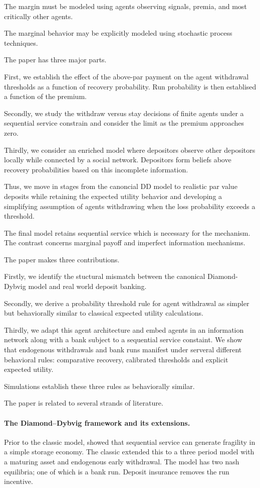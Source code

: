 \documentclass[12pt]{article}\usepackage[]{graphicx}\usepackage[]{xcolor}
\begin{document}
The margin must be modeled using agents observing signals, premia, and most critically other agents.

The marginal behavior may be explicitly modeled using stochastic process techniques. 

The paper has three major parts. 

First, we establish the effect of the above-par payment on the agent withdrawal thresholds as a function of recovery probability. 
Run probability is then establised a function of the premium.

Secondly, we study the withdraw versus stay decisions of finite agents under a sequential service constrain and 
consider the limit as the premium approaches zero.

Thirdly, we consider an enriched model where depositors observe other depositors locally while connected by a social network. 
Depositors form beliefs above recovery probabilities based on this incomplete information.

Thus, we move in stages from the canoncial DD model to realistic par value deposits while retaining the expected utility 
behavior and developing a simplifying assumption of agents withdrawing when the loss probability exceeds a threshold. 

The final model retains sequential service which is necessary for the mechanism. The contrast concerns marginal payoff and
imperfect information mechanisms.

The paper makes three contributions.

Firstly, we identify the stuctural mismatch between the canonical Diamond-Dybvig model and real world deposit banking.

Secondly, we derive a probability threshold rule for agent withdrawal as simpler but behaviorally similar to 
classical expected utility calculations.

Thirdly, we adapt this agent architecture and embed agents in an information network along with a bank subject to a 
sequential service constaint. We show that endogenous withdrawals and bank runs manifest under serveral different behavioral rules:
comparative recovery, calibrated thresholds and explicit expected utility.

Simulations establish these three rules as behaviorally similar.

The paper is related to several strands of literature.

\paragraph{The Diamond--Dybvig framework and its extensions.}
Prior to the classic model, \citet{bryant1980model} showed that sequential service can generate fragility in a simple storage economy.
The classic \citet{diamond1983bank} extended this to a three period model with a maturing asset and endogenous early withdrawal.
The model has two nash equilibria; one of which is a bank run. Deposit insurance removes the run incentive.
\end{document}
